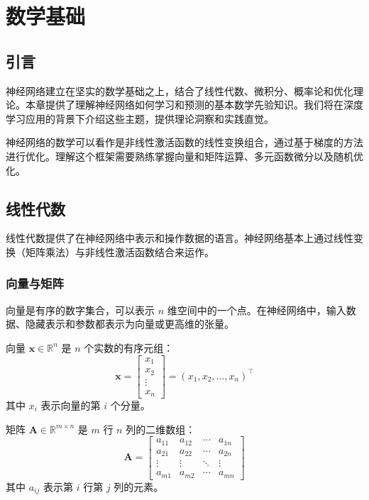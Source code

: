 \clearpage
\cleardoublepage

\chapter{数学基础}

\section{引言}

神经网络建立在坚实的数学基础之上，结合了线性代数、微积分、概率论和优化理论。本章提供了理解神经网络如何学习和预测的基本数学先验知识。我们将在深度学习应用的背景下介绍这些主题，提供理论洞察和实践直觉。

神经网络的数学可以看作是非线性激活函数的线性变换组合，通过基于梯度的方法进行优化。理解这个框架需要熟练掌握向量和矩阵运算、多元函数微分以及随机优化。

\section{线性代数}

线性代数提供了在神经网络中表示和操作数据的语言。神经网络基本上通过线性变换（矩阵乘法）与非线性激活函数结合来运作。

\subsection{向量与矩阵}

向量是有序的数字集合，可以表示 $n$ 维空间中的一个点。在神经网络中，输入数据、隐藏表示和参数都表示为向量或更高维的张量。

\begin{定义}[向量]
向量 $\mathbf{x} \in \mathbb{R}^n$ 是 $n$ 个实数的有序元组：
\begin{equation}
\mathbf{x} = \begin{bmatrix} x_1 \\ x_2 \\ \vdots \\ x_n \end{bmatrix} = (x_1, x_2, \ldots, x_n)^\top
\end{equation}
其中 $x_i$ 表示向量的第 $i$ 个分量。
\end{定义}

\begin{定义}[矩阵]
矩阵 $\mathbf{A} \in \mathbb{R}^{m \times n}$ 是 $m$ 行 $n$ 列的二维数组：
\begin{equation}
\mathbf{A} = \begin{bmatrix}
a_{11} & a_{12} & \cdots & a_{1n} \\
a_{21} & a_{22} & \cdots & a_{2n} \\
\vdots & \vdots & \ddots & \vdots \\
a_{m1} & a_{m2} & \cdots & a_{mn}
\end{bmatrix}
\end{equation}
其中 $a_{ij}$ 表示第 $i$ 行第 $j$ 列的元素。
\end{定义}

